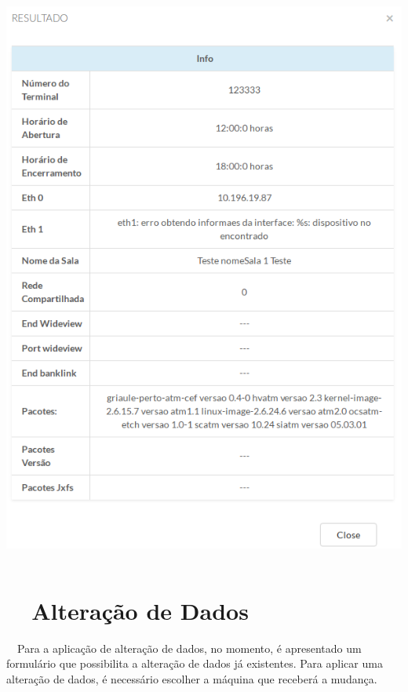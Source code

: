     \begin{center}
    \includegraphics[width=13.936cm,height=19.131cm]{figuras/RATCETECATMSTFLS051718v2-img004.png}
    \end{center}

    \bigskip


    \bigskip

    \section[\ \ Altera\c{c}\~ao de Dados]{\ \ Altera\c{c}\~ao de Dados}
{\color{black}
    \ \ Para a aplica\c{c}\~ao de altera\c{c}\~ao de dados, no momento, \'e apresentado um formul\'ario que possibilita a
        altera\c{c}\~ao de dados j\'a existentes. Para aplicar uma altera\c{c}\~ao de dados, \'e necess\'ario escolher a
        m\'aquina que receber\'a a mudan\c{c}a.}

